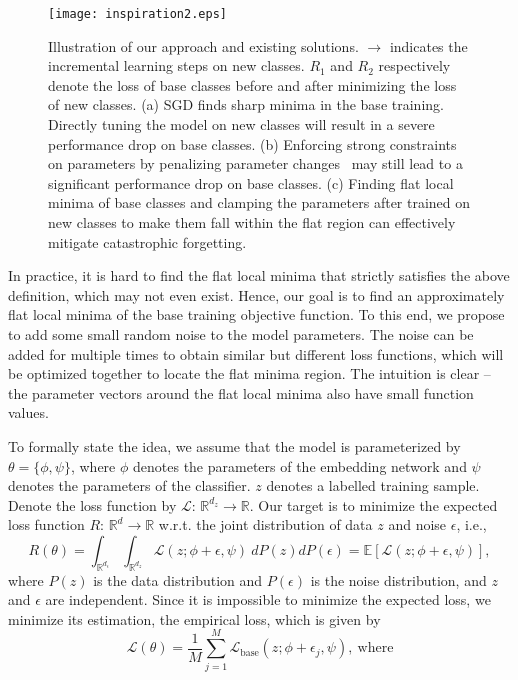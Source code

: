 \documentclass{article}
\begin{document}
\begin{figure}[t]
  \centering
    \texttt{[image: inspiration2.eps]} \label{fig_emb_tf}
  \caption{Illustration of our approach and existing solutions. $\to$ indicates the incremental learning steps on new classes. $R_1$ and $R_2$ respectively denote the loss of base classes before and after minimizing the loss of new classes. (a) SGD finds sharp minima in the base training. Directly tuning the model on new classes will result in a severe performance drop on base classes. (b) Enforcing strong constraints on parameters by penalizing parameter changes~\citep{aljundi2018memory,kirkpatrick2017overcoming,FSLL} may still lead to a significant performance drop on base classes. (c) Finding flat local minima of base classes and clamping the parameters after trained on new classes to make them fall within the flat region can effectively mitigate catastrophic forgetting.
  }
  \label{fig_illustration}
\end{figure}

In practice, it is hard to find the flat local minima that strictly satisfies the above definition, which may not even exist. Hence, our goal is to find an approximately flat local minima of the base training objective function. To this end, we propose to add some small random noise to the model parameters. The noise can be added for multiple times to obtain similar but different loss functions, which will be optimized together to locate the flat minima region. The intuition is clear -- the parameter vectors around the flat local minima also have small function values. 

To formally state the idea, we assume that the model is parameterized by $\theta =\{\phi,\psi\}$, where $\phi$ denotes the parameters of the embedding network and $\psi$ denotes the parameters of the classifier. $z$ denotes a labelled training sample. 
Denote the loss function by $\mathcal{L}$: $\mathbb{R}^{d_z}\to\mathbb{R}$. 
Our target is to minimize the expected loss function $R$: $\mathbb{R}^{d}\to\mathbb{R}$ w.r.t. the joint distribution of data $z$ and noise $\epsilon$, i.e.,
\begin{equation}\label{eq:Risk}
    R(\theta) = \int_{\mathbb{R}^{d_\epsilon}}\int_{\mathbb{R}^{d_z}}\mathcal{L}(z; \phi+\epsilon, \psi)\:d P(z)d P(\epsilon) = \mathbb{E}[\mathcal{L}(z; \phi+\epsilon, \psi)],
\end{equation}
where $P(z)$ is the data distribution and $P(\epsilon)$ is the noise distribution, and $z$ and $\epsilon$ are independent.
Since it is impossible to minimize the expected loss, we minimize its estimation, the empirical loss, which is given by
\begin{equation}\label{eq:emprical_risk}
    \mathcal{L}(\theta) = \frac{1}{M}\sum_{j=1}^{M}\mathcal{L}_{\text{base}}(z;\phi +\epsilon_j, \psi), ~\text{where}
\end{equation}
\end{document}

